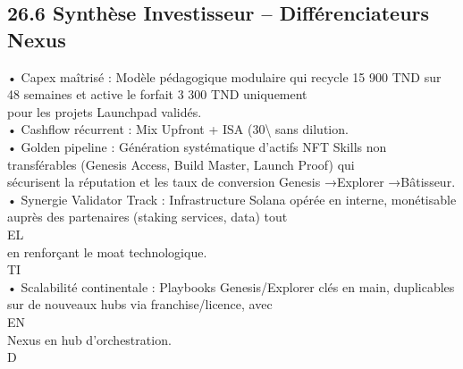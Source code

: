 \subsection{26.6 Synthèse Investisseur – Différenciateurs Nexus}
• Capex maîtrisé : Modèle pédagogique modulaire qui recycle 15 900 TND sur 48 semaines et active le forfait 3 300 TND uniquement\\
pour les projets Launchpad validés.\\
\vspace{0.5em}
• Cashflow récurrent : Mix Upfront + ISA (30\textbackslash{}%
sans dilution.\\
\vspace{0.5em}
• Golden pipeline : Génération systématique d’actifs NFT Skills non transférables (Genesis Access, Build Master, Launch Proof) qui\\
sécurisent la réputation et les taux de conversion Genesis →Explorer →Bâtisseur.\\
\vspace{0.5em}
• Synergie Validator Track : Infrastructure Solana opérée en interne, monétisable auprès des partenaires (staking services, data) tout\\
\vspace{0.5em}
\vspace{0.5em}
\vspace{0.5em}
\vspace{0.5em}
EL\\
en renforçant le moat technologique.\\
\vspace{0.5em}
\vspace{0.5em}
\vspace{0.5em}
\vspace{0.5em}
TI\\
• Scalabilité continentale : Playbooks Genesis/Explorer clés en main, duplicables sur de nouveaux hubs via franchise/licence, avec\\
\vspace{0.5em}
\vspace{0.5em}
\vspace{0.5em}
\vspace{0.5em}
EN\\
Nexus en hub d’orchestration.\\
\vspace{0.5em}
\vspace{0.5em}
\vspace{0.5em}
\vspace{0.5em}
D\\
